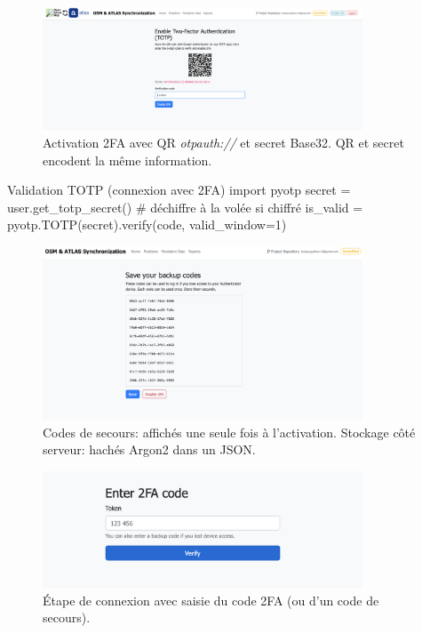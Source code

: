 \begin{figure}[H]
  \centering
  \includegraphics[width=0.85\textwidth]{../figures/chap10/enable_up2fa.png}
  \caption{Activation 2FA avec QR \textit{otpauth://} et secret Base32. QR et secret encodent la même information.}
\end{figure}

\begin{codebox}[language=Python]{Validation TOTP (connexion avec 2FA)}
import pyotp
secret = user.get_totp_secret()  # déchiffre à la volée si chiffré
is_valid = pyotp.TOTP(secret).verify(code, valid_window=1)
\end{codebox}

\begin{figure}[H]
  \centering
  \includegraphics[width=0.85\textwidth]{../figures/chap10/backupcodes.png}
  \caption{Codes de secours: affichés une seule fois à l'activation. Stockage côté serveur: hachés Argon2 dans un JSON.}
\end{figure}

\begin{figure}[H]
  \centering
  \includegraphics[width=0.85\textwidth]{../figures/chap10/enter2FA.png}
  \caption{Étape de connexion avec saisie du code 2FA (ou d'un code de secours).}
\end{figure}

